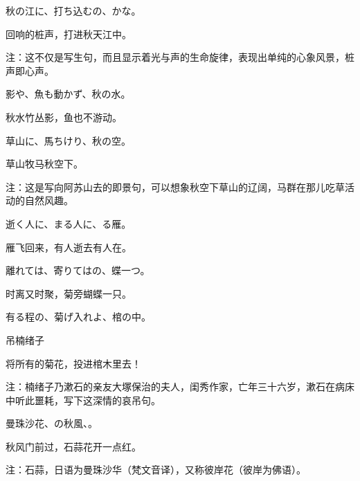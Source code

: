 \begin{haiku}
    {\FH 秋の江に、打ち込むの、かな。}

    {\FK 回响的桩声，打进秋天江中。}

    {\FT 注：这不仅是写生句，而且显示着光与声的生命旋律，表现出单纯的心象风景，桩声即心声。}
\end{haiku}

\begin{haiku}
    {\FH {}影や、魚も動かず、秋の水。}

    {\FK 秋水竹丛影，鱼也不游动。}
\end{haiku}

\begin{haiku}
    {\FH 草山に、馬ちけり、秋の空。}

    {\FK 草山牧马秋空下。}

    {\FT 注：这是写向阿苏山去的即景句，可以想象秋空下草山的辽阔，马群在那儿吃草活动的自然风趣。}
\end{haiku}

\begin{haiku}
    {\FH 逝く人に、まる人に、る雁。}

    {\FK 雁飞回来，有人逝去有人在。}
\end{haiku}

\begin{haiku}
    {\FH 離れては、寄りてはの、蝶一つ。}

    {\FK 时离又时聚，菊旁蝴蝶一只。}
\end{haiku}

\begin{haiku}
    {\FH 有る程の、菊げ入れよ、棺の中。}

    {\FK 吊楠绪子}

    {\FK 将所有的菊花，投进棺木里去！}

    {\FT 注：楠绪子乃漱石的亲友大塚保治的夫人，闺秀作家，亡年三十六岁，漱石在病床中听此噩耗，写下这深情的哀吊句。}
\end{haiku}

\begin{haiku}
    {\FH 曼珠沙花、の秋風、。}

    {\FK 秋风门前过，石蒜花开一点红。}

    {\FT 注：石蒜，日语为曼珠沙华（梵文音译），又称彼岸花（彼岸为佛语）。}
\end{haiku}

